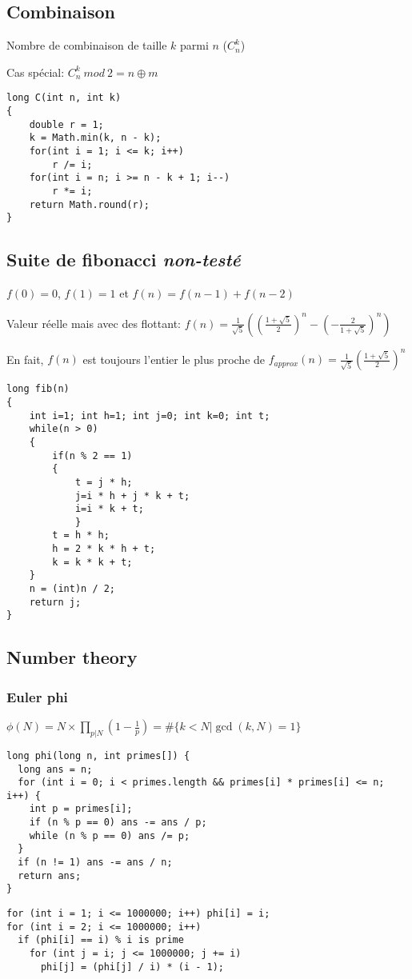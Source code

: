 \subsection{Combinaison}
Nombre de combinaison de taille $k$ parmi $n$ ($C^k_n$)

Cas spécial: $C^k_n\ mod\ 2 = n\oplus m$
\begin{lstlisting}
long C(int n, int k)
{
	double r = 1;
	k = Math.min(k, n - k);
	for(int i = 1; i <= k; i++)
		r /= i;
	for(int i = n; i >= n - k + 1; i--)
		r *= i;
	return Math.round(r);
}
\end{lstlisting}
\subsection{Suite de fibonacci {\footnotesize \textit{non-testé}}}
$f(0) = 0$, $f(1) = 1$ et $f(n) = f(n - 1) + f(n - 2)$

Valeur réelle mais avec des flottant: $f(n)=\frac{1}{\sqrt{5}}((\frac{1+\sqrt{5}}{2})^n-(-\frac{2}{1+\sqrt{5}})^n)$

En fait, $f(n)$ est toujours l'entier le plus proche de $f_{approx}(n)=\frac{1}{\sqrt{5}}(\frac{1+\sqrt{5}}{2})^n$
\begin{lstlisting}
long fib(n)
{
	int i=1; int h=1; int j=0; int k=0; int t;
	while(n > 0)
	{
		if(n % 2 == 1)
		{
			t = j * h;
			j=i * h + j * k + t; 
			i=i * k + t;
    		}
   		t = h * h;
   		h = 2 * k * h + t;
   		k = k * k + t;
	}
	n = (int)n / 2; 
	return j;
}
\end{lstlisting}

\subsection{Number theory}
\subsubsection{Euler phi}
$\phi(N) = N \times \prod_{p | N} (1 - \frac{1}{p}) = \#\{k < N | \gcd(k,N) = 1\}$
\begin{lstlisting}
long phi(long n, int primes[]) {
  long ans = n;
  for (int i = 0; i < primes.length && primes[i] * primes[i] <= n; i++) {
    int p = primes[i];
    if (n % p == 0) ans -= ans / p;
    while (n % p == 0) ans /= p;
  }
  if (n != 1) ans -= ans / n;
  return ans;
}
\end{lstlisting}
\begin{lstlisting}
for (int i = 1; i <= 1000000; i++) phi[i] = i;
for (int i = 2; i <= 1000000; i++)
  if (phi[i] == i) % i is prime
    for (int j = i; j <= 1000000; j += i)
      phi[j] = (phi[j] / i) * (i - 1);
\end{lstlisting}
